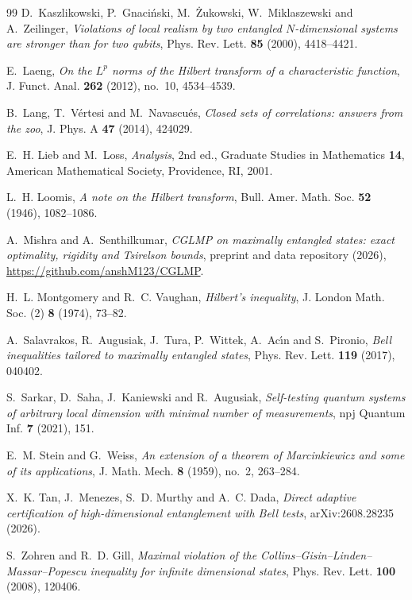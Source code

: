 \documentclass[11pt]{amsart}
\theoremstyle{definition}
\theoremstyle{remark}
\begin{document}
\begin{thebibliography}{99}
D.~Kaszlikowski, P.~Gnaci\'nski, M.~\.Zukowski, W.~Miklaszewski and A.~Zeilinger, \emph{Violations of local realism
by two entangled $N$-dimensional systems are stronger than for two qubits}, Phys. Rev. Lett. \textbf{85} (2000),
4418--4421.

E.~Laeng, \emph{On the $L^p$ norms of the Hilbert transform of a characteristic function}, J. Funct. Anal.
\textbf{262} (2012), no.~10, 4534--4539.

B.~Lang, T.~V\'ertesi and M.~Navascu\'es, \emph{Closed sets of correlations: answers from the zoo}, J. Phys. A
\textbf{47} (2014), 424029.

E.~H. Lieb and M.~Loss, \emph{Analysis}, 2nd ed., Graduate Studies in Mathematics \textbf{14}, American
Mathematical Society, Providence, RI, 2001.

L.~H. Loomis, \emph{A note on the Hilbert transform}, Bull. Amer. Math. Soc. \textbf{52} (1946), 1082--1086.

A.~Mishra and A.~Senthilkumar, \emph{CGLMP on maximally entangled states: exact optimality, rigidity and
Tsirelson bounds}, preprint and data repository (2026), \url{https://github.com/anshM123/CGLMP}.

H.~L. Montgomery and R.~C. Vaughan, \emph{Hilbert's inequality}, J. London Math. Soc. (2) \textbf{8} (1974), 73--82.

A.~Salavrakos, R.~Augusiak, J.~Tura, P.~Wittek, A.~Ac\'{\i}n and S.~Pironio, \emph{Bell inequalities tailored to
maximally entangled states}, Phys. Rev. Lett. \textbf{119} (2017), 040402.

S.~Sarkar, D.~Saha, J.~Kaniewski and R.~Augusiak, \emph{Self-testing quantum systems of arbitrary local dimension
with minimal number of measurements}, npj Quantum Inf. \textbf{7} (2021), 151.

E.~M. Stein and G.~Weiss, \emph{An extension of a theorem of Marcinkiewicz and some of its applications}, J. Math.
Mech. \textbf{8} (1959), no.~2, 263--284.

X.~K. Tan, J.~Menezes, S.~D. Murthy and A.~C. Dada, \emph{Direct adaptive certification of high-dimensional
entanglement with Bell tests}, arXiv:2608.28235 (2026).

S.~Zohren and R.~D. Gill, \emph{Maximal violation of the Collins--Gisin--Linden--Massar--Popescu inequality for
infinite dimensional states}, Phys. Rev. Lett. \textbf{100} (2008), 120406.

\end{thebibliography}
\end{document}
